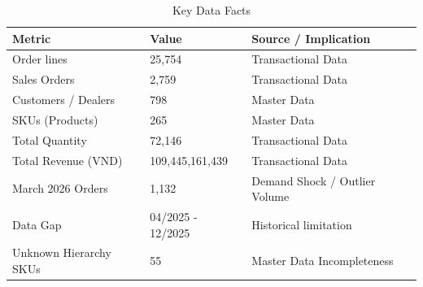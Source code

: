 \begin{table}[htbp]
\centering
\caption{Key Data Facts}
\label{tab:key_facts}
\begin{tabular}{lll}
\toprule
\textbf{Metric} & \textbf{Value} & \textbf{Source / Implication} \\
\midrule
Order lines & 25,754 & Transactional Data \\
Sales Orders & 2,759 & Transactional Data \\
Customers / Dealers & 798 & Master Data \\
SKUs (Products) & 265 & Master Data \\
Total Quantity & 72,146 & Transactional Data \\
Total Revenue (VND) & 109,445,161,439 & Transactional Data \\
March 2026 Orders & 1,132 & Demand Shock / Outlier Volume \\
Data Gap & 04/2025 - 12/2025 & Historical limitation \\
Unknown Hierarchy SKUs & 55 & Master Data Incompleteness \\
\bottomrule
\end{tabular}
\end{table}
